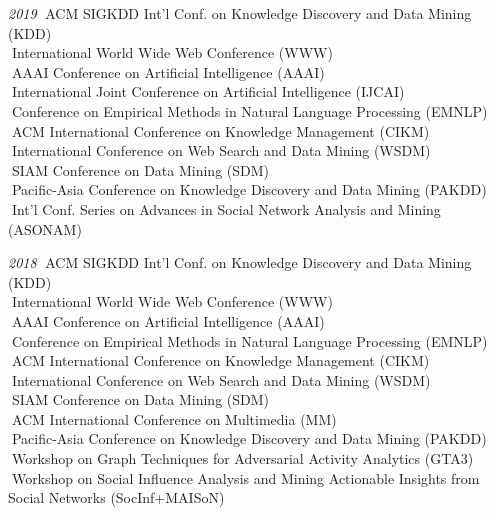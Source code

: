 \documentclass[10pt]{article}
\newenvironment{myindentpar}[1]%
{\begin{list}{}%
         {\setlength{\leftmargin}{#1}}%
         \item[]%
}
{\end{list}}
\newcounter{list}
\begin{document}
\begin{myindentpar}{0.75cm}
{\hspace{-0.75cm}\textit{2019}
\textcolor{white}{.}ACM SIGKDD Int'l Conf. on Knowledge Discovery and Data Mining (KDD) \\
\textcolor{white}{.}International World Wide Web Conference (WWW) \\
\textcolor{white}{.}AAAI Conference on Artificial Intelligence (AAAI) \\
\textcolor{white}{.}International Joint Conference on Artificial Intelligence (IJCAI) \\
\textcolor{white}{.}Conference on Empirical Methods in Natural Language Processing (EMNLP) \\
\textcolor{white}{.}ACM International Conference on Knowledge Management (CIKM) \\
\textcolor{white}{.}International Conference on Web Search and Data Mining (WSDM) \\
\textcolor{white}{.}SIAM Conference on Data Mining (SDM) \\
\textcolor{white}{.}Pacific-Asia Conference on Knowledge Discovery and Data Mining (PAKDD) \\
\textcolor{white}{.}Int'l Conf. Series on Advances in Social Network Analysis and Mining (ASONAM)
	
\hspace{-0.75cm}\textit{2018}
\textcolor{white}{.}ACM SIGKDD Int'l Conf. on Knowledge Discovery and Data Mining (KDD) \\
\textcolor{white}{.}International World Wide Web Conference (WWW) \\
\textcolor{white}{.}AAAI Conference on Artificial Intelligence (AAAI) \\
\textcolor{white}{.}Conference on Empirical Methods in Natural Language Processing (EMNLP) \\
\textcolor{white}{.}ACM International Conference on Knowledge Management (CIKM) \\
\textcolor{white}{.}International Conference on Web Search and Data Mining (WSDM) \\
\textcolor{white}{.}SIAM Conference on Data Mining (SDM) \\
\textcolor{white}{.}ACM International Conference on Multimedia (MM) \\
\textcolor{white}{.}Pacific-Asia Conference on Knowledge Discovery and Data Mining (PAKDD) \\
\textcolor{white}{.}Workshop on Graph Techniques for Adversarial Activity Analytics (GTA3) \\
\textcolor{white}{.}Workshop on Social Influence Analysis and Mining Actionable Insights from Social Networks (SocInf+MAISoN)

}
\end{myindentpar}
\end{document}
